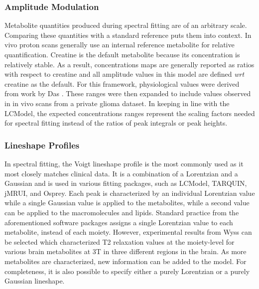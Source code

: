 \subsubsection{Amplitude Modulation}
Metabolite quantities produced during spectral fitting are of an arbitrary scale. Comparing these quantities with a standard reference puts them into context. In vivo proton scans generally use an internal reference metabolite for relative quantification. Creatine is the default metabolite because its concentration is relatively stable. As a result, concentrations maps are generally reported as ratios with respect to creatine and all amplitude values in this model are defined \textit{wrt} creatine as the default. For this framework, physiological values were derived from work by Das \etal\cite{Das2017,Das2018}. These ranges were then expanded to include values observed in in vivo scans from a private glioma dataset. In keeping in line with the LCModel, the expected concentrations ranges represent the scaling factors needed for spectral fitting instead of the ratios of peak integrals or peak heights.
 
\subsubsection{Lineshape Profiles}
In spectral fitting, the Voigt lineshape profile is the most commonly used as it most closely matches clinical data. It is a combination of a Lorentzian and a Gaussian and is used in various fitting packages, such as LCModel\cite{Provencher2001}, TARQUIN\cite{Wilson2011}, jMRUI\cite{Stefan2009}, and Osprey\cite{Oeltzschner2020}. Each peak is characterized by an individual Lorentzian value while a single Gaussian value is applied to the metabolites, while a second value can be applied to the macromolecules and lipids. Standard practice from the aforementioned software packages assigns a single Lorentzian value to each metabolite, instead of each moiety. However, experimental results from Wyss \etal\cite{Wyss2018} can be selected which characterized T2 relaxation values at the moiety-level for various brain metabolites at 3T in three different regions in the brain. As more metabolites are characterized, new information can be added to the model. For completeness, it is also possible to specify either a purely Lorentzian or a purely Gaussian lineshape.
 
